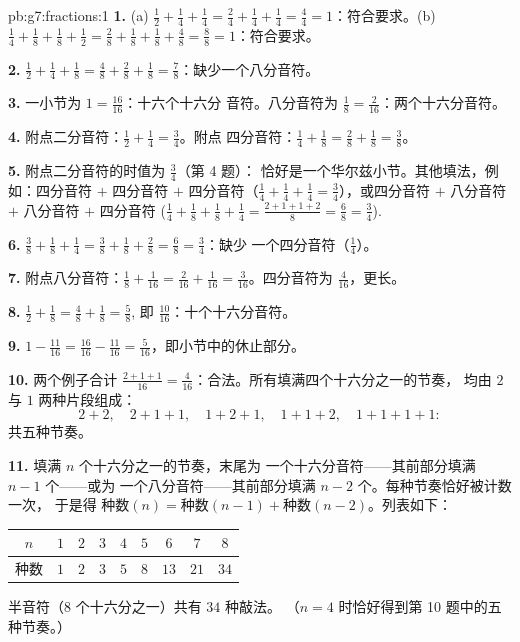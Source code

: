 \begin{solution}{pb:g7:fractions:1}
\textbf{1.} (a) $\frac12 + \frac14 + \frac14 = \frac24 + \frac14
+ \frac14 = \frac44 = 1$：符合要求。(b) $\frac14 + \frac18 +
\frac18 + \frac12 = \frac28 + \frac18 + \frac18 + \frac48 =
\frac88 = 1$：符合要求。

\textbf{2.} $\frac12 + \frac14 + \frac18 = \frac48 + \frac28 +
\frac18 = \frac78$：缺少一个八分音符。

\textbf{3.} 一小节为 $1 = \frac{16}{16}$：十六个十六分
音符。八分音符为 $\frac18 = \frac{2}{16}$：两个十六分音符。

\textbf{4.} 附点二分音符：$\frac12 + \frac14 = \frac34$。附点
四分音符：$\frac14 + \frac18 = \frac28 + \frac18 = \frac38$。

\textbf{5.} 附点二分音符的时值为 $\frac34$（第 4 题）：
恰好是一个华尔兹小节。其他填法，例如：四分音符
$+$ 四分音符 $+$ 四分音符（$\frac14 + \frac14 + \frac14 =
\frac34$），或四分音符 $+$ 八分音符 $+$ 八分音符 $+$ 四分音符
($\frac14 + \frac18 + \frac18 + \frac14 = \frac{2 + 1 + 1 +
2}{8} = \frac68 = \frac34$).

\textbf{6.} $\frac38 + \frac18 + \frac14 = \frac38 + \frac18 +
\frac28 = \frac68 = \frac34$：缺少
一个四分音符（$\frac14$）。

\textbf{7.} 附点八分音符：$\frac18 + \frac{1}{16} =
\frac{2}{16} + \frac{1}{16} = \frac{3}{16}$。四分音符为
$\frac{4}{16}$，更长。

\textbf{8.} $\frac12 + \frac18 = \frac48 + \frac18 = \frac58$,
即 $\frac{10}{16}$：十个十六分音符。

\textbf{9.} $1 - \frac{11}{16} = \frac{16}{16} - \frac{11}{16}
= \frac{5}{16}$，即小节中的休止部分。

\textbf{10.} 两个例子合计 $\frac{2 + 1 + 1}{16} =
\frac{4}{16}$：合法。所有填满四个十六分之一的节奏，
均由 $2$ 与 $1$ 两种片段组成：
\[
2{+}2, \quad 2{+}1{+}1, \quad 1{+}2{+}1, \quad 1{+}1{+}2, \quad
1{+}1{+}1{+}1 :
\]
共五种节奏。

\textbf{11.} 填满 $n$ 个十六分之一的节奏，末尾为
一个十六分音符——其前部分填满 $n - 1$ 个——或为
一个八分音符——其前部分填满 $n - 2$ 个。每种节奏恰好被计数一次，
于是得
$\text{种数}(n) = \text{种数}(n-1) + \text{种数}(n-2)$。列表如下：
\begin{center}
\renewcommand{\arraystretch}{1.2}
\begin{tabular}{c|cccccccc}
$n$ & $1$ & $2$ & $3$ & $4$ & $5$ & $6$ & $7$ & $8$ \\
\hline
种数 & $1$ & $2$ & $3$ & $5$ & $8$ & $13$ & $21$ & $34$ \\
\end{tabular}
\end{center}
半音符（$8$ 个十六分之一）共有 $34$ 种敲法。
（$n = 4$ 时恰好得到第 10 题中的五种节奏。）


\end{solution}
